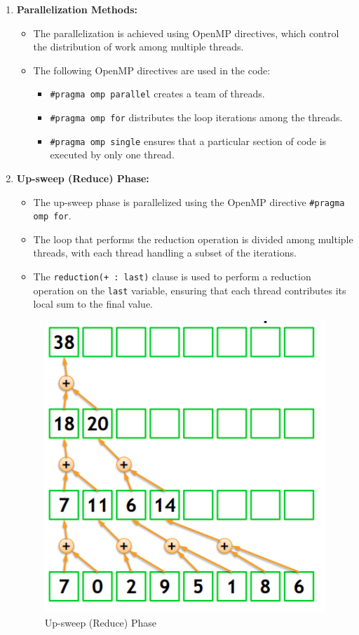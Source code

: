 \begin{enumerate}
\begin{itemize}
  \end{itemize}

  \item \textbf{Parallelization Methods:}
  \begin{itemize}
    \item The parallelization \cite{parallelalgorithms} is achieved using OpenMP directives, which control the distribution of work among multiple threads.
    \item The following OpenMP directives are used in the code:
    \begin{itemize}
      \item \lstinline|#pragma omp parallel| creates a team of threads.
      \item \lstinline|#pragma omp for| distributes the loop iterations among the threads.
      \item \lstinline|#pragma omp single| ensures that a particular section of code is executed by only one thread.
    \end{itemize}
  \end{itemize}

  \newpage

  \item \textbf{Up-sweep (Reduce) Phase:}
  \begin{itemize}
    \item The up-sweep phase is parallelized using the OpenMP directive \lstinline|#pragma omp for|.
    \item The loop that performs the reduction operation is divided among multiple threads, with each thread handling a subset of the iterations.
    \item The \lstinline|reduction(+ : last)| clause is used to perform a reduction operation on the \lstinline|last| variable, ensuring that each thread contributes its local sum to the final value.
  \end{itemize}

  \begin{figure}[htb]
	\centering
	\includegraphics[width=0.3\linewidth]{pics/scanUpSweep.png}
    	\caption{Up-sweep (Reduce) Phase}\label{fig:scanExample}
\end{figure}


\end{enumerate}
